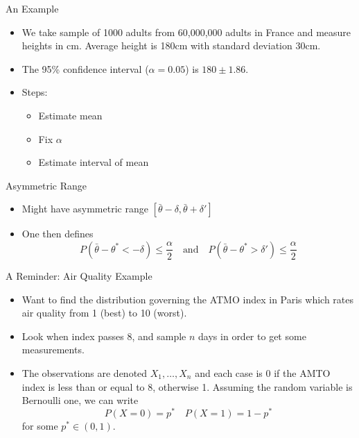\documentclass{beamer}
\begin{document}
\begin{frame}{An Example} 
\begin{itemize}
 \item We take sample of 1000 adults from 60,000,000 adults in France and measure heights in cm. Average height is 180cm with standard deviation 30cm. 
\item The 95\% confidence interval ($\alpha = 0.05$) is $180 \pm 1.86$.  
\item Steps: 
\begin{itemize}
\item Estimate mean 
\item Fix $\alpha$ 
\item Estimate interval of mean  
\end{itemize} 
\end{itemize}
\end{frame}

\begin{frame}{Asymmetric Range} 
\begin{itemize} 
 \item Might have asymmetric range $[\bar{\theta} - \delta, \bar{\theta} + \delta']$
 \item One then defines 
\begin{displaymath} 
 P(\bar{\theta} - \theta^* < -\delta  ) \leq \frac{\alpha}{2} \quad \mbox{and} \quad P(\bar{\theta} - \theta^* > \delta') \leq \frac{\alpha}{2}
\end{displaymath}
\end{itemize}
\end{frame}
 
\begin{frame}{A Reminder: Air Quality Example} 
\begin{itemize}
 \item Want to find the distribution governing the ATMO index in Paris which rates air quality from 1 (best) to 10 (worst). 
 \item Look when index passes 8, and sample $n$ days in order to get some measurements. 
 \item The observations are denoted $X_1, \ldots, X_n$ and each case is 0 if the AMTO index is less than or equal to 8, otherwise 1. Assuming the random variable is Bernoulli one, we can write 
\begin{displaymath}
P(X = 0) = p^* \quad P(X = 1) = 1- p^*  
\end{displaymath}
for some $p^* \in (0, 1)$. 
\end{itemize}
\end{frame}
\end{document}
